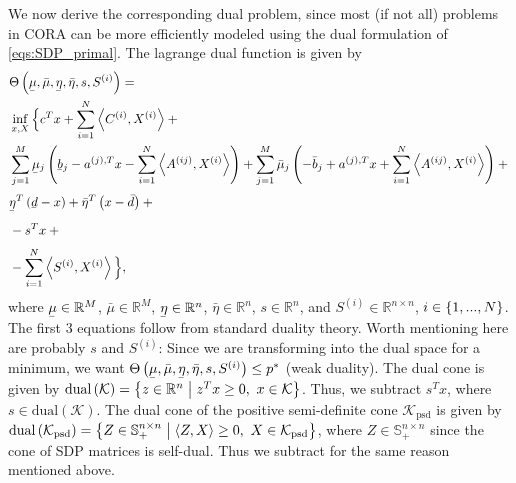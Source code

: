 \documentclass{article}
\newcommand{\f}[2]{#1\left(#2\right)}
\newcommand{\setdef}[2][]{
	\left\{
	\ifblank{#1}{}{#1 \hspace{.1cm} \middle| \hspace{.1cm}}
	#2
	\right\}
}
\newcommand{\var}[2]{{#1}_{\mathrm{#2}}}
\newcommand{\set}[1]{\mathcal{#1}}
\newcommand{\trace}[1]{\left\langle #1\right\rangle}
\newcommand{\ubar}[1]{\underaccent{\bar}{#1}}
\begin{document}
	We now derive the corresponding dual problem, since most (if not all) problems in CORA can be more efficiently modeled using the dual formulation of \cref{eqs:SDP_primal}. The lagrange dual function is given by
	\begin{equation}\label{eq:dual_not_simplifed}
		\begin{aligned}
			&\f{\Theta}{\ubar{\mu},\bar{\mu},\ubar{\eta},\bar{\eta},s,S^{(i)}} = \\
			&\inf_{x,X} \Big\{ c^Tx + \sum_{i=1}^{N} \trace{C^{(i)},X^{(i)}} + \Big.\\
			&\Big.\sum_{j=1}^{M} \ubar{\mu}_j\left(\ubar{b}_j - a^{(j),T}x-\sum_{i=1}^{N}\trace{A^{(ij)},X^{(i)}}\right)+\sum_{j=1}^{M} \bar{\mu}_j\left(-\bar{b}_j + a^{(j),T}x+\sum_{i=1}^{N}\trace{A^{(ij)},X^{(i)}}\right)+\Big.\\
			&\Big. \ubar{\eta}^T\left(\ubar{d}-x\right) + \bar{\eta}^T\left(x-\bar{d}\right)+\Big.\\ &\Big. -s^Tx+\Big.\\
			&\Big. -\sum_{i=1}^{N}\trace{S^{(i)},X^{(i)}} \Big\},
		\end{aligned}
	\end{equation}
	where $\ubar{\mu}\in\mathbb{R}^M$, $\bar{\mu}\in\mathbb{R}^M$, $\ubar{\eta}\in\mathbb{R}^n$, $\bar{\eta}\in\mathbb{R}^n$, $s\in\mathbb{R}^n$, and $S^{(i)}\in\mathbb{R}^{n\times n}$, $i\in\setdef{1,...,N}$.
	The first 3 equations follow from standard duality theory. Worth mentioning here are probably $s$ and $S^{(i)}$: Since we are transforming into the dual space for a minimum, we want $\f{\Theta}{\ubar{\mu},\bar{\mu},\ubar{\eta},\bar{\eta},s,S^{(i)}}\leq p^*$ (weak duality). The dual cone is given by $\f{\text{dual}}{\set{K}} = \setdef[z\in\mathbb{R}^n]{z^Tx\geq 0, \ x\in\set{K}}$. Thus, we subtract $s^Tx$, where $s\in\f{\text{dual}}{\set{K}}$. The dual cone of the positive semi-definite cone $\var{\set{K}}{psd}$ is given by $\f{\text{dual}}{\var{\set{K}}{psd}}=\setdef[Z\in\mathbb{S}_+^{n\times n}]{\trace{Z,X}\geq 0,\ X\in\var{\set{K}}{psd}}$, where $Z\in\mathbb{S}_+^{n\times n}$ since the cone of SDP matrices is self-dual. Thus we subtract for the same reason mentioned above.
	
\end{document}
